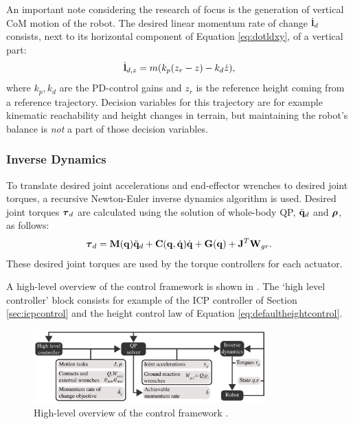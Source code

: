 An important note considering the research of focus is the generation of vertical \ac{CoM} motion of the robot. The desired linear momentum rate of change $\dot{\mathbf{l}}_d$ consists, next to its horizontal component of Equation \eqref{eq:dotldxy}, of a vertical part:
\begin{equation}
\dot{\mathbf{l}}_{d,z} =m(k_p(z_r-z) - k_d\dot{z}), 
\label{eq:defaultheightcontrol}
\end{equation}
where $k_p, k_d$ are the PD-control gains and $z_r$ is the reference height coming from a reference trajectory. Decision variables for this trajectory are for example kinematic reachability and height changes in terrain, but maintaining the robot's balance is \textit{not} a part of those decision variables.


\subsubsection{Inverse Dynamics} 
To translate desired joint accelerations and end-effector wrenches to desired joint torques, a recursive Newton-Euler inverse dynamics algorithm is used. Desired joint torques $\boldsymbol{\tau}_d$ are calculated using the solution of whole-body \ac{QP}, $\ddot{\mathbf{q}}_d$ and $\boldsymbol{\rho}$, as follows:
\begin{equation}
    \boldsymbol{\tau}_d = \mathbf{M}(\mathbf{q})\ddot{\mathbf{q}}_d + \mathbf{C}(\mathbf{q},\dot{\mathbf{q}})\dot{\mathbf{q}} + \mathbf{G}(\mathbf{q}) + \mathbf{J}^T \mathbf{W}_{gr}.
\end{equation}
These desired joint torques are used by the torque controllers for each actuator.

A high-level overview of the control framework is shown in . The `high level controller' block consists for example of the \ac{ICP} controller of Section \ref{sec:icpcontrol} and the height control law of Equation \eqref{eq:defaultheightcontrol}.
\begin{figure}[h]
\centering
\includegraphics[width=0.8\textwidth]{STYLESTUFF/controlframework.png}
\caption{High-level overview of the control framework \cite{koolen2016design}. }
\label{fig:framework}
\end{figure}

